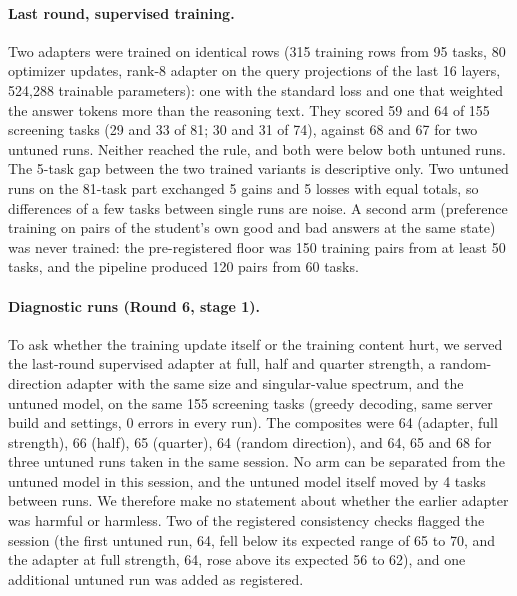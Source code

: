 \paragraph{Last round, supervised training.} Two adapters were trained on identical rows (315 training rows from 95 tasks, 80 optimizer updates, rank-8 adapter on the query projections of the last 16 layers, 524{,}288 trainable parameters): one with the standard loss and one that weighted the answer tokens more than the reasoning text. They scored 59 and 64 of 155 screening tasks (29 and 33 of 81; 30 and 31 of 74), against 68 and 67 for two untuned runs. Neither reached the rule, and both were below both untuned runs. The 5-task gap between the two trained variants is descriptive only. Two untuned runs on the 81-task part exchanged 5 gains and 5 losses with equal totals, so differences of a few tasks between single runs are noise. %
A second arm (preference training on pairs of the student's own good and bad answers at the same state) was never trained: the pre-registered floor was 150 training pairs from at least 50 tasks, and the pipeline produced 120 pairs from 60 tasks. %

\paragraph{Diagnostic runs (Round 6, stage 1).} To ask whether the training update itself or the training content hurt, we served the last-round supervised adapter at full, half and quarter strength, a random-direction adapter with the same size and singular-value spectrum, and the untuned model, on the same 155 screening tasks (greedy decoding, same server build and settings, 0 errors in every run). The composites were 64 (adapter, full strength), 66 (half), 65 (quarter), 64 (random direction), and 64, 65 and 68 for three untuned runs taken in the same session. %
No arm can be separated from the untuned model in this session, and the untuned model itself moved by 4 tasks between runs. We therefore make no statement about whether the earlier adapter was harmful or harmless. Two of the registered consistency checks flagged the session (the first untuned run, 64, fell below its expected range of 65 to 70, and the adapter at full strength, 64, rose above its expected 56 to 62), and one additional untuned run was added as registered. %

